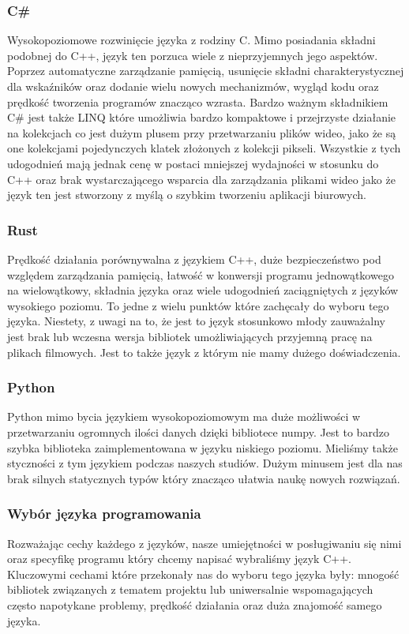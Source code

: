 \documentclass[twoside]{projektInzynierskiMS}
\begin{document}
\subsubsection{C\#}
Wysokopoziomowe rozwinięcie języka z rodziny C. Mimo posiadania składni podobnej do C++, język ten porzuca wiele z nieprzyjemnych jego aspektów. Poprzez automatyczne zarządzanie pamięcią, usunięcie składni charakterystycznej dla wskaźników oraz dodanie wielu nowych mechanizmów, wygląd kodu oraz prędkość tworzenia programów znacząco wzrasta. Bardzo ważnym składnikiem C\# jest także LINQ które umożliwia bardzo kompaktowe i przejrzyste działanie na kolekcjach co jest dużym plusem przy przetwarzaniu plików wideo, jako że są one kolekcjami pojedynczych klatek złożonych z kolekcji pikseli. Wszystkie z tych udogodnień mają jednak cenę w postaci mniejszej wydajności w stosunku do C++ oraz brak wystarczającego wsparcia dla zarządzania plikami wideo jako że język ten jest stworzony z myślą o szybkim tworzeniu aplikacji biurowych. 

\subsubsection{Rust}
Prędkość działania porównywalna z językiem C++, duże bezpieczeństwo pod względem zarządzania pamięcią, łatwość w konwersji programu jednowątkowego na wielowątkowy, składnia języka oraz wiele udogodnień zaciągniętych z języków wysokiego poziomu. To jedne z wielu punktów które zachęcały do wyboru tego języka. Niestety, z uwagi na to, że jest to język stosunkowo młody zauważalny jest brak lub wczesna wersja bibliotek umożliwiających przyjemną pracę na plikach filmowych. Jest to także język z którym nie mamy dużego doświadczenia.

\subsubsection{Python}
Python mimo bycia językiem wysokopoziomowym ma duże możliwości w przetwarzaniu ogromnych ilości danych dzięki bibliotece numpy. Jest to bardzo szybka biblioteka zaimplementowana w języku niskiego poziomu. Mieliśmy także styczności z tym językiem podczas naszych studiów. Dużym minusem jest dla nas brak silnych statycznych typów który znacząco ułatwia naukę nowych rozwiązań.

\subsubsection{Wybór języka programowania}
Rozważając cechy każdego z języków, nasze umiejętności w posługiwaniu się nimi oraz specyfikę programu który chcemy napisać wybraliśmy język C++. Kluczowymi cechami które przekonały nas do wyboru tego języka były: mnogość bibliotek związanych z tematem projektu lub uniwersalnie wspomagających często napotykane problemy, prędkość działania oraz duża znajomość samego języka.
\end{document}
